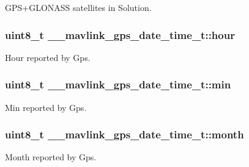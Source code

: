 G\+P\+S+\+G\+L\+O\+N\+A\+S\+S satellites in Solution. 

\hypertarget{struct____mavlink__gps__date__time__t_a7cbd5aeeb68f7205f0539eaa1941dedd}{
\subsubsection[{hour}]{\setlength{\rightskip}{0pt plus 5cm}uint8\+\_\+t \+\_\+\+\_\+mavlink\+\_\+gps\+\_\+date\+\_\+time\+\_\+t\+::hour}}\label{struct____mavlink__gps__date__time__t_a7cbd5aeeb68f7205f0539eaa1941dedd}


Hour reported by Gps. 

\hypertarget{struct____mavlink__gps__date__time__t_a19dabe59973f6702b2f93a404bf3e36c}{
\subsubsection[{min}]{\setlength{\rightskip}{0pt plus 5cm}uint8\+\_\+t \+\_\+\+\_\+mavlink\+\_\+gps\+\_\+date\+\_\+time\+\_\+t\+::min}}\label{struct____mavlink__gps__date__time__t_a19dabe59973f6702b2f93a404bf3e36c}


Min reported by Gps. 

\hypertarget{struct____mavlink__gps__date__time__t_a44b17003a2485dc80dc6504c00342457}{
\subsubsection[{month}]{\setlength{\rightskip}{0pt plus 5cm}uint8\+\_\+t \+\_\+\+\_\+mavlink\+\_\+gps\+\_\+date\+\_\+time\+\_\+t\+::month}}\label{struct____mavlink__gps__date__time__t_a44b17003a2485dc80dc6504c00342457}


Month reported by Gps. 

